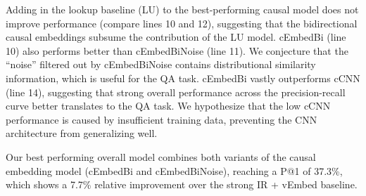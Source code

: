 Adding in the lookup baseline (LU) to the best-performing causal model does not improve performance (compare lines 10 and 12), suggesting that the bidirectional causal embeddings subsume the contribution of the LU model.  
cEmbedBi (line 10) also performs better than cEmbedBiNoise (line 11). We conjecture that the ``noise'' filtered out by cEmbedBiNoise contains distributional similarity information, which is useful for the QA task.  cEmbedBi vastly outperforms cCNN (line 14), suggesting that strong overall performance across the precision-recall curve better translates to the QA task.  We hypothesize that the low cCNN performance is caused by insufficient training data, preventing the CNN architecture from generalizing well. 

Our best performing overall model combines both variants of the causal embedding model (cEmbedBi and cEmbedBiNoise), reaching a P@1 of 37.3\%, which shows a 7.7\% relative improvement over the strong IR + vEmbed baseline.



